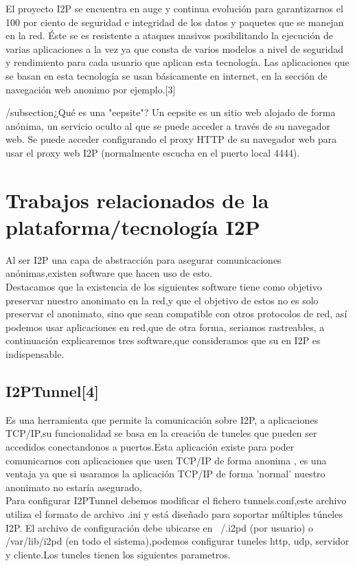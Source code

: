 \documentclass[12]{article}
\begin{document}
El proyecto I2P se encuentra en auge y continua evolución para garantizarnos el 100 por ciento de seguridad e integridad de los datos y paquetes que se manejan en la red. Éste se  es resistente a ataques masivos posibilitando la ejecución de varias aplicaciones a 
la vez ya que consta de varios modelos a nivel de seguridad y rendimiento para cada usuario que aplican esta tecnología. Las aplicaciones que se basan en esta tecnología se usan básicamente en internet, en la sección de navegación web anonimo por ejemplo.[3]
 
/subsection{¿Qué es una "eepsite"?}
Un eepsite es un sitio web alojado de forma anónima, un servicio oculto al que se puede acceder a través de su navegador web. Se puede acceder configurando el proxy HTTP de su navegador web para usar el proxy web I2P (normalmente escucha en el puerto local 4444).

\pagebreak

\section{Trabajos relacionados de la plataforma/tecnología I2P}

Al ser  I2P una capa de abstracción para asegurar comunicaciones anónimas,existen software que hacen uso de esto.
\\

Destacamos que la existencia de los siguientes software tiene como objetivo preservar nuestro anonimato en la red,y que el objetivo de estos no es solo preservar
el anonimato, sino que sean compatible con otros protocolos de red, así podemos usar aplicaciones en red,que de otra forma, seriamos rastreables,
a continuación explicaremos tres software,que consideramos que su en I2P  es indispensable.
\subsection{I2PTunnel[4]}

Es una herramienta que permite la comunicación sobre I2P, a aplicaciones TCP/IP,su funcionalidad se basa en la creación de tuneles que pueden ser accedidos
conectandonos a puertos.Esta aplicación existe para poder comunicarnos con aplicaciones que usen TCP/IP de forma anonima , es una ventaja ya que si usaramos la aplicación TCP/IP de forma 'normal'
nuestro anonimato no estaría asegurado,
\\

Para configurar I2PTunnel debemos modificar el fichero tunnels.conf,este archivo utiliza el formato de archivo .ini y está diseñado para soportar múltiples túneles I2P. El archivo 
de configuración debe ubicarse en  ~/.i2pd (por usuario) o /var/lib/i2pd (en todo el sistema),podemos configurar tuneles http, udp, servidor y cliente.Los tuneles tienen los 
siguientes parametros.
\\
\end{document}
